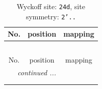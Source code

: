 \documentclass[fleqn,8pt]{jsarticle}
\begin{document}
\renewcommand{\arraystretch}{1.2}
\begin{longtable}{ccc}
\caption{Wyckoff site: {\tt 24d}, site symmetry: {\tt 2'..}}
 \\
 \hline \hline
No. & position & mapping \\ \hline \endfirsthead

\multicolumn{2}{l}{\tablename\ \thetable{}} \\
 \hline \hline
No. & position & mapping \\ \hline \endhead

 \hline \hline
\multicolumn{2}{r}{\footnotesize\it continued ...} \\ \endfoot

 \hline \hline
\multicolumn{2}{r}{} \\ \endlastfoot


\end{longtable}
\end{document}

